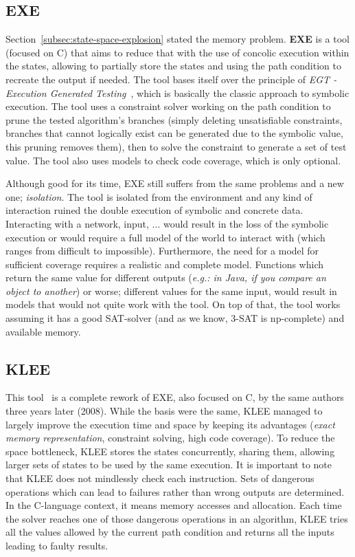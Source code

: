 \documentclass[11pt, conference]{IEEEtran}
\begin{document}
  \subsection{EXE}
    \label{subsec:exe}
    Section~\ref{subsec:state-space-explosion} stated the memory problem. \textbf{EXE} is a tool (focused on C) that aims to reduce that with the use of concolic execution within the states, allowing to partially store the states and using the path condition to recreate the output if needed. The tool bases itself over the principle of \emph{EGT - Execution Generated Testing}~\cite{exe}, which is basically the classic approach to symbolic execution. The tool uses a constraint solver working on the path condition to prune the tested algorithm's branches (simply deleting unsatisfiable constraints, branches that cannot logically exist can be generated due to the symbolic value, this pruning removes them), then to solve the constraint to generate a set of test value. The tool also uses models to check code coverage, which is only optional.

    Although good for its time, EXE still suffers from the same problems and a new one; \emph{isolation}. The tool is isolated from the environment and any kind of interaction ruined the double execution of symbolic and concrete data. Interacting with a network, input, ... would result in the loss of the symbolic execution or would require a full model of the world to interact with (which ranges from difficult to impossible). Furthermore, the need for a model for sufficient coverage requires a realistic and complete model. Functions which return the same value for different outputs (\emph{e.g.: in Java, if you compare an object to another}) or worse; different values for the same input, would result in models that would not quite work with the tool. On top of that, the tool works assuming it has a good SAT-solver (and as we know, 3-SAT is np-complete) and available memory.

  \subsection{KLEE}
    \label{subsec:klee}
    This tool~\cite{klee} is a complete rework of EXE, also focused on C, by the same authors three years later (2008). While the basis were the same, KLEE managed to largely improve the execution time and space by keeping its advantages (\emph{exact memory representation}, constraint solving, high code coverage). To reduce the space bottleneck, KLEE stores the states concurrently, sharing them, allowing larger sets of states to be used by the same execution. It is important to note that KLEE does not mindlessly check each instruction. Sets of dangerous operations which can lead to failures rather than wrong outputs are determined. In the C-language context, it means memory accesses and allocation. Each time the solver reaches one of those dangerous operations in an algorithm, KLEE tries all the values allowed by the current path condition and returns all the inputs leading to faulty results.
\end{document}
